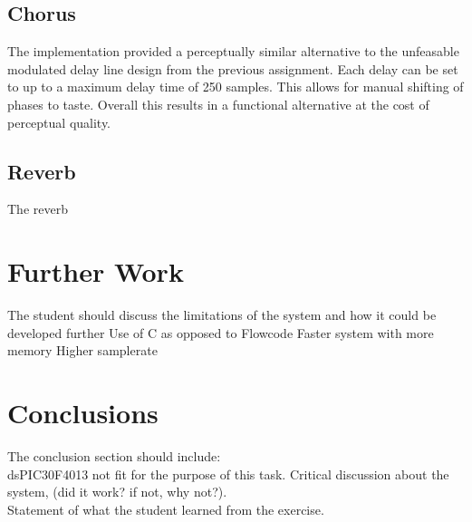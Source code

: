 \documentclass[titlepage]{scrartcl}
\begin{document}
        \subsection{Chorus}
        The implementation provided a perceptually similar alternative to the
        unfeasable modulated delay line design from the previous assignment.  
        Each delay can be set to up to a maximum delay time of 250 samples.
        This allows for manual shifting of phases to taste. Overall this
        results in a functional alternative at the cost of perceptual quality.
        \subsection{Reverb}
        The reverb 

        
    \section{Further Work}
    The student should discuss the limitations of the system and how it could be developed further
    Use of C as opposed to Flowcode
    Faster system with more memory
    Higher samplerate


    \section{Conclusions}
    The conclusion section should include:\\
    dsPIC30F4013 not fit for the purpose of this task.
        Critical discussion about the system, (did it work? if not, why
        not?).\\
        Statement of what the student learned from the exercise.\\

    \printbibliography
\end{document}
